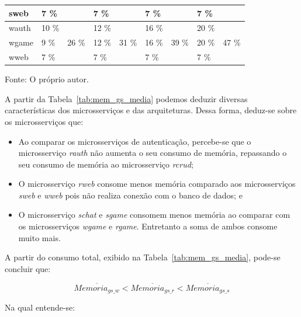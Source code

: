 \begin{table}[htb!]
\begin{adjustbox}{max width=\textwidth}
\begin{tabular}{l|l|l|l|l|l|l|l|l}
sweb                            & 7 \%   &                         & 7 \%   &                         & 7 \%   &                         & 7 \%   &                         \\ \hline \hline
wauth                           & 10 \%  & \multirow{3}{*}{26 \%}  & 12 \%  & \multirow{3}{*}{31 \%}  & 16 \%  & \multirow{3}{*}{39 \%}  & 20 \%  & \multirow{3}{*}{47 \%}  \\ \cline{1-2} \cline{4-4} \cline{6-6} \cline{8-8}
wgame                           & 9 \%   &                         & 12 \%  &                         & 16 \%  &                         & 20 \%  &                         \\ \cline{1-2} \cline{4-4} \cline{6-6} \cline{8-8}
wweb                            & 7 \%   &                         & 7 \%   &                         & 7 \%   &                         & 7 \%   &                         \\ \hline \hline
\end{tabular}
\end{adjustbox}

Fonte: O próprio autor.
\end{table}

A partir da Tabela~\ref{tab:mem_gs_media} podemos deduzir diversas características dos microsserviços e das arquiteturas.
%
Dessa forma, deduz-se sobre os microsserviços que:

\begin{itemize}
 \item Ao comparar os microsserviços de autenticação, percebe-se que o microsserviço \textit{rauth} não aumenta o seu consumo de memória, repassando o seu consumo de memória ao microsserviço \textit{rcrud};
 \item O microsserviço \textit{rweb} consome menos memória comparado aos microsserviços \textit{sweb} e \textit{wweb} pois não realiza conexão com o banco de dados; e
 \item O microsserviço \textit{schat} e \textit{sgame} consomem menos memória ao comparar com os microsserviços \textit{wgame} e \textit{rgame}. Entretanto a soma de ambos consome muito mais.
\end{itemize}

A partir do consumo total, exibido na Tabela~\ref{tab:mem_gs_media}, pode-se concluir que:

$$
    \overline{Memoria_{gs\_w}} < \overline{Memoria_{gs\_r}} < \overline{Memoria_{gs\_s}}
$$

Na qual entende-se:

